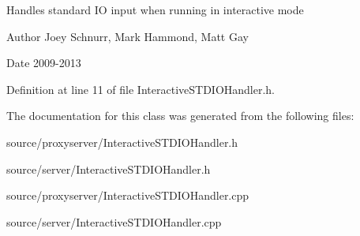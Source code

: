 Handles standard I\-O input when running in interactive mode \begin{DoxyAuthor}{Author}
Joey Schnurr, Mark Hammond, Matt Gay 
\end{DoxyAuthor}
\begin{DoxyDate}{Date}
2009-\/2013 
\end{DoxyDate}


Definition at line 11 of file Interactive\-S\-T\-D\-I\-O\-Handler.\-h.



The documentation for this class was generated from the following files\-:\begin{DoxyCompactItemize}
\item 
source/proxyserver/Interactive\-S\-T\-D\-I\-O\-Handler.\-h\item 
source/server/Interactive\-S\-T\-D\-I\-O\-Handler.\-h\item 
source/proxyserver/Interactive\-S\-T\-D\-I\-O\-Handler.\-cpp\item 
source/server/Interactive\-S\-T\-D\-I\-O\-Handler.\-cpp\end{DoxyCompactItemize}
